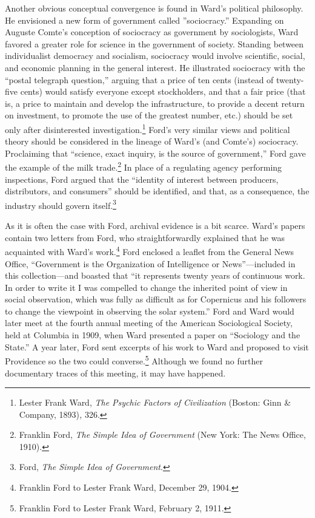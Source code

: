 \documentclass[twoside,symmetric,nobib,justified]{tufte-book}
\begin{document}
Another obvious conceptual convergence is found in Ward's political
philosophy. He envisioned a new form of government called
''sociocracy.'' Expanding on Auguste Comte's conception of sociocracy as
government by sociologists, Ward favored a greater role for science in
the government of society. Standing between individualist democracy and
socialism, sociocracy would involve scientific, social, and economic
planning in the general interest. He illustrated sociocracy with the
``postal telegraph question,'' arguing that a price of ten cents
(instead of twenty-five cents) would satisfy everyone except
stockholders, and that a fair price (that is, a price to maintain and
develop the infrastructure, to provide a decent return on investment, to
promote the use of the greatest number, etc.) should be set only after
disinterested investigation.\footnote{Lester Frank Ward, \emph{The
  Psychic Factors of Civilization} (Boston: Ginn \& Company,
  1893)\emph{,} 326.} Ford's very similar views and political theory
should be considered in the lineage of Ward's (and Comte's) sociocracy.
Proclaiming that ``science, exact inquiry, is the source of
government,'' Ford gave the example of the milk trade.\footnote{Franklin
  Ford, \emph{The Simple Idea of Government} (New York: The News Office,
  1910).} In place of a regulating agency performing inspections, Ford
argued that the ``identity of interest between producers, distributors,
and consumers'' should be identified, and that, as a consequence, the
industry should govern itself.\footnote{Ford, \emph{The Simple Idea of
  Government}.}

As it is often the case with Ford, archival evidence is a bit scarce.
Ward's papers contain two letters from Ford, who straightforwardly
explained that he was acquainted with Ward's work.\footnote{Franklin
  Ford to Lester Frank Ward, December 29, 1904.} Ford enclosed a leaflet
from the General News Office, ``Government is the Organization of
Intelligence or News''---included in this collection---and boasted that
``it represents twenty years of continuous work. In order to write it I
was compelled to change the inherited point of view in social
observation, which was fully as difficult as for Copernicus and his
followers to change the viewpoint in observing the solar system.'' Ford
and Ward would later meet at the fourth annual meeting of the American
Sociological Society, held at Columbia in 1909, when Ward presented a
paper on ``Sociology and the State.'' A year later, Ford sent excerpts
of his work to Ward and proposed to visit Providence so the two could
converse.\footnote{Franklin Ford to Lester Frank Ward, February 2, 1911.}
Although we found no further documentary traces of this meeting, it may
have happened.
\end{document}
